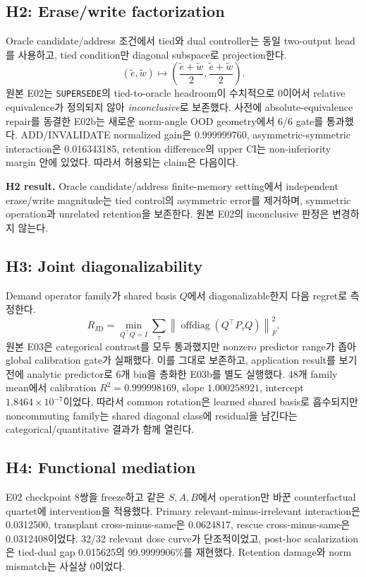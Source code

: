 \documentclass[10.3pt,a4paper]{article}
\newcommand{\op}[1]{\texttt{#1}}
\begin{document}
\subsection{H2: Erase/write factorization}
Oracle candidate/address 조건에서 tied와 dual controller는 동일 two-output head를 사용하고, tied condition만 diagonal subspace로 projection한다.
\[
(\tilde e,\tilde w)\mapsto
\left(\frac{\tilde e+\tilde w}{2},\frac{\tilde e+\tilde w}{2}\right).
\]
원본 E02는 \op{SUPERSEDE}의 tied-to-oracle headroom이 수치적으로 0이어서 relative equivalence가 정의되지 않아 \emph{inconclusive}로 보존했다. 사전에 absolute-equivalence repair를 동결한 E02b는 새로운 norm-angle OOD geometry에서 6/6 gate를 통과했다. ADD/INVALIDATE normalized gain은 0.999999760, asymmetric-symmetric interaction은 0.016343185, retention difference의 upper CI는 non-inferiority margin 안에 있었다. 따라서 허용되는 claim은 다음이다.

\begin{resultbox}
\textbf{H2 result.} Oracle candidate/address finite-memory setting에서 independent erase/write magnitude는 tied control의 asymmetric error를 제거하며, symmetric operation과 unrelated retention을 보존한다. 원본 E02의 inconclusive 판정은 변경하지 않는다.
\end{resultbox}

\subsection{H3: Joint diagonalizability}
Demand operator family가 shared basis $Q$에서 diagonalizable한지 다음 regret로 측정한다.
\[
R_{\mathrm{JD}}=
\min_{Q^\top Q=I}
\sum_{\tau}
\left\|\operatorname{offdiag}(Q^\top P_\tau Q)\right\|_F^2.
\]
원본 E03은 categorical contrast를 모두 통과했지만 nonzero predictor range가 좁아 global calibration gate가 실패했다. 이를 그대로 보존하고, application result를 보기 전에 analytic predictor로 6개 bin을 층화한 E03b를 별도 실행했다. 48개 family mean에서 calibration $R^2=0.999998169$, slope $1.000258921$, intercept $1.8464\times10^{-7}$이었다. 따라서 common rotation은 learned shared basis로 흡수되지만 noncommuting family는 shared diagonal class에 residual을 남긴다는 categorical/quantitative 결과가 함께 열린다.

\subsection{H4: Functional mediation}
E02 checkpoint 8쌍을 freeze하고 같은 $S,A,B$에서 operation만 바꾼 counterfactual quartet에 intervention을 적용했다. Primary relevant-minus-irrelevant interaction은 0.0312500, transplant cross-minus-same은 0.0624817, rescue cross-minus-same은 0.0312408이었다. 32/32 relevant dose curve가 단조적이었고, post-hoc scalarization은 tied-dual gap 0.015625의 99.9999906\%를 재현했다. Retention damage와 norm mismatch는 사실상 0이었다.
\end{document}
